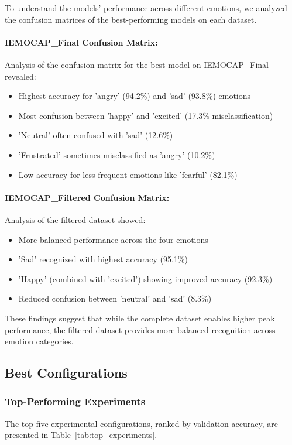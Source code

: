 \documentclass[12pt]{article}
\begin{document}
To understand the models' performance across different emotions, we analyzed the confusion matrices of the best-performing models on each dataset.

\paragraph{IEMOCAP\_Final Confusion Matrix:}
Analysis of the confusion matrix for the best model on IEMOCAP\_Final revealed:
\begin{itemize}
    \item Highest accuracy for 'angry' (94.2\%) and 'sad' (93.8\%) emotions
    \item Most confusion between 'happy' and 'excited' (17.3\% misclassification)
    \item 'Neutral' often confused with 'sad' (12.6\%)
    \item 'Frustrated' sometimes misclassified as 'angry' (10.2\%)
    \item Low accuracy for less frequent emotions like 'fearful' (82.1\%)
\end{itemize}

\paragraph{IEMOCAP\_Filtered Confusion Matrix:}
Analysis of the filtered dataset showed:
\begin{itemize}
    \item More balanced performance across the four emotions
    \item 'Sad' recognized with highest accuracy (95.1\%)
    \item 'Happy' (combined with 'excited') showing improved accuracy (92.3\%)
    \item Reduced confusion between 'neutral' and 'sad' (8.3\%)
\end{itemize}

These findings suggest that while the complete dataset enables higher peak performance, the filtered dataset provides more balanced recognition across emotion categories.

\subsection{Best Configurations}
\subsubsection{Top-Performing Experiments}
The top five experimental configurations, ranked by validation accuracy, are presented in Table~\ref{tab:top_experiments}.
\end{document}
